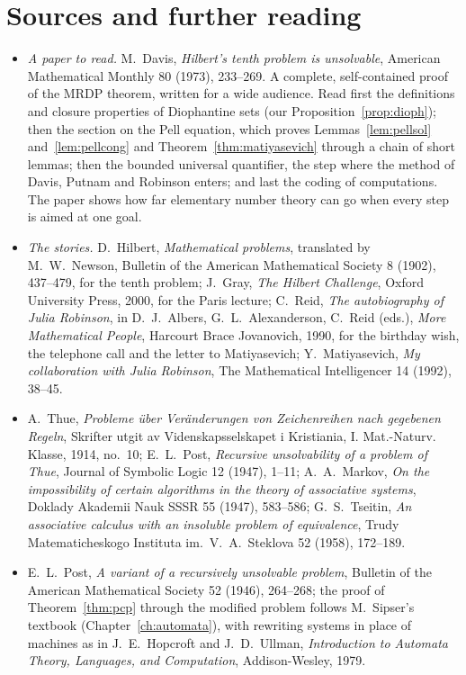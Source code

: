 \section*{Sources and further reading}

\begin{itemize}
\item \emph{A paper to read.} M.~Davis, \emph{Hilbert's tenth problem is unsolvable}, American Mathematical Monthly 80 (1973), 233--269. A complete, self-contained proof of the MRDP theorem, written for a wide audience. Read first the definitions and closure properties of Diophantine sets (our Proposition~\ref{prop:dioph}); then the section on the Pell equation, which proves Lemmas~\ref{lem:pellsol} and~\ref{lem:pellcong} and Theorem~\ref{thm:matiyasevich} through a chain of short lemmas; then the bounded universal quantifier, the step where the method of Davis, Putnam and Robinson enters; and last the coding of computations. The paper shows how far elementary number theory can go when every step is aimed at one goal.
\item \emph{The stories.} D.~Hilbert, \emph{Mathematical problems}, translated by M.~W.~Newson, Bulletin of the American Mathematical Society 8 (1902), 437--479, for the tenth problem; J.~Gray, \emph{The Hilbert Challenge}, Oxford University Press, 2000, for the Paris lecture; C.~Reid, \emph{The autobiography of Julia Robinson}, in D.~J.~Albers, G.~L.~Alexanderson, C.~Reid (eds.), \emph{More Mathematical People}, Harcourt Brace Jovanovich, 1990, for the birthday wish, the telephone call and the letter to Matiyasevich; Y.~Matiyasevich, \emph{My collaboration with Julia Robinson}, The Mathematical Intelligencer 14 (1992), 38--45.
\item A.~Thue, \emph{Probleme über Veränderungen von Zeichenreihen nach gegebenen Regeln}, Skrifter utgit av Videnskapsselskapet i Kristiania, I. Mat.-Naturv. Klasse, 1914, no.~10; E.~L.~Post, \emph{Recursive unsolvability of a problem of Thue}, Journal of Symbolic Logic 12 (1947), 1--11; A.~A.~Markov, \emph{On the impossibility of certain algorithms in the theory of associative systems}, Doklady Akademii Nauk SSSR 55 (1947), 583--586; G.~S.~Tseitin, \emph{An associative calculus with an insoluble problem of equivalence}, Trudy Matematicheskogo Instituta im.\ V.~A.~Steklova 52 (1958), 172--189.
\item E.~L.~Post, \emph{A variant of a recursively unsolvable problem}, Bulletin of the American Mathematical Society 52 (1946), 264--268; the proof of Theorem~\ref{thm:pcp} through the modified problem follows M.~Sipser's textbook (Chapter~\ref{ch:automata}), with rewriting systems in place of machines as in J.~E.~Hopcroft and J.~D.~Ullman, \emph{Introduction to Automata Theory, Languages, and Computation}, Addison-Wesley, 1979.

\end{itemize}
